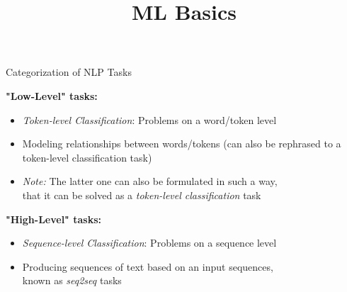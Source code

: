 


\newcommand*\POS[1]{\textsubscript{\texttt{#1}}} %
\usepackage{qtree} %

\newcommand{\titlefigure}{figure/tasks.png}
\newcommand{\learninggoals}{
\item Understand the different types of tasks
\item Linguistic tasks vs. higher-level tasks}

\title{ML Basics}
\date{}




\begin{vbframe}{Categorization of NLP Tasks}

\vfill

\textbf{"Low-Level" tasks:}

	\begin{itemize}
		\item \textit{Token-level Classification}: Problems on a word/token level
		\item Modeling relationships between words/tokens (can also be rephrased to a token-level classification task)
		\item \textit{Note:} The latter one can also be formulated in such a way,\\that it can be solved as a \textit{token-level classification} task
	\end{itemize}
	
\vspace{.3cm}

\textbf{"High-Level" tasks:}

	\begin{itemize}
		\item \textit{Sequence-level Classification}: Problems on a sequence level
		\item Producing sequences of text based on an input sequences,\\known as \textit{seq2seq} tasks
	\end{itemize}

\vfill

\end{vbframe}



